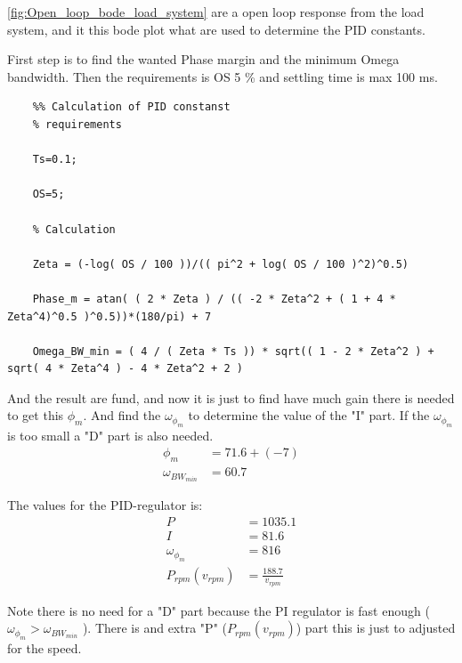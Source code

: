 \ref{fig:Open_loop_bode_load_system} are a open loop response from the load system, and it this bode plot what are used to determine the PID constants.

First step is to find the wanted Phase margin and the minimum Omega bandwidth. Then the requirements is OS 5 \% and settling time is max 100 ms.

\newpage

\begin{lstlisting}
	%% Calculation of PID constanst
	% requirements
	
	Ts=0.1;
	
	OS=5; 
	
	% Calculation
	
	Zeta = (-log( OS / 100 ))/(( pi^2 + log( OS / 100 )^2)^0.5)
	
	Phase_m = atan( ( 2 * Zeta ) / (( -2 * Zeta^2 + ( 1 + 4 * Zeta^4)^0.5 )^0.5))*(180/pi) + 7
	
	Omega_BW_min = ( 4 / ( Zeta * Ts )) * sqrt(( 1 - 2 * Zeta^2 ) + sqrt( 4 * Zeta^4 ) - 4 * Zeta^2 + 2 ) 
\end{lstlisting} 

And the result are fund, and now it is just to find have much gain there is needed to get this $ \phi_{m} $. And find the $ \omega _{\phi _{m}} $ to determine the value of the "I" part. If the $ \omega _{\phi _{m}} $ is too small a "D" part is also needed. 
\begin{equation}
	\begin{split}
		\phi_{m} &= 71.6 + ( -7 )\\
		\omega_{{BW}_{{min}}} &= 60.7
	\end{split}
\end{equation}

The values for the PID-regulator is: 
\begin{equation}
	\begin{split}
		P &= 1035.1\\
		I &= 81.6\\
		\omega _{\phi _{m}} &= 816\\
		P_{{rpm}} \left( v_{{rpm}} \right) &= \frac{188.7}{v_{{rpm}}}
	\end{split}
\end{equation}

Note there is no need for a "D" part because the PI regulator is fast enough ($ \omega _{\phi _{m}} > \omega_{{BW}_{{min}}} $ ). There is and extra "P" ($ P_{{rpm}} \left( v_{{rpm}} \right) $) part this is just to adjusted for the speed.


